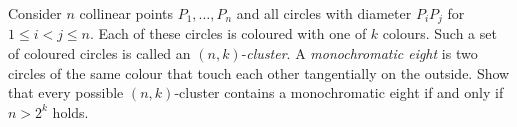 Consider $n$ collinear points $P_1, \ldots, P_n$ and all circles with
diameter $P_iP_j$ for $1 \leq i < j \leq n$. Each of these circles is coloured with
one of $k$ colours. Such a set of coloured circles is called an $(n,k)$-\emph{cluster}.
A \emph{monochromatic eight} is two circles of the same colour that touch each other
tangentially on the outside. Show that every possible $(n,k)$-cluster contains a
monochromatic eight if and only if $n>2^k$ holds.
